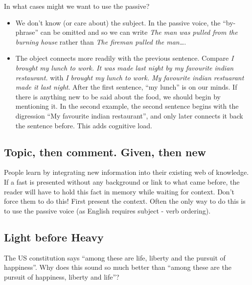 \documentclass{article}
\newcommand{\example}[1]{\textit{#1}}
\begin{document}
In what cases might we want to use the passive?
\begin{itemize}
    \item We don't know (or care about) the subject. In the passive voice, the ``by-phrase'' can be omitted and so we can write \example{The man was pulled from the burning house} rather than \example{The fireman pulled the man\ldots}.
    \item The object connects more readily with the previous sentence. Compare \example{I brought my lunch to work. It was made last night by my favourite indian restaurant.} with \example{I brought my lunch to work. My favourite indian restuarant made it last night}. After the first sentence, ``my lunch'' is on our minds. If there is anything new to be said about the food, we should begin by mentioning it. In the second example, the second sentence begins with the digression ``My favourite indian restaurant'', and only later connects it back the sentence before. This adds cognitive load.
\end{itemize}

\subsection{Topic, then comment. Given, then new}

People learn by integrating new information into their existing web of knowledge. If a fast is presented without any background or link to what came before, the reader will have to hold this fact in memory while waiting for context. Don't force them to do this! First present the context. Often the only way to do this is to use the passive voice (as English requires subject - verb ordering).



\subsection{Light before Heavy}

The US constitution says ``among these are life, liberty and the pursuit of happiness''. Why does this sound so much better than ``among these are the pursuit of happiness, liberty and life''?
\end{document}
